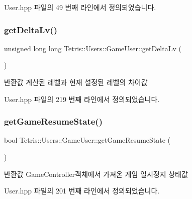 User.\+hpp 파일의 49 번째 라인에서 정의되었습니다.

\mbox{\label{class_tetris_1_1_users_1_1_game_user_a1a55323cff69015417ad4d214b985724}} 
\subsubsection{\texorpdfstring{get\+Delta\+Lv()}{getDeltaLv()}}
{\footnotesize\ttfamily unsigned long long Tetris\+::\+Users\+::\+Game\+User\+::get\+Delta\+Lv (\begin{DoxyParamCaption}{ }\end{DoxyParamCaption})\hspace{0.3cm}{\ttfamily [inline]}}

\begin{DoxyReturn}{반환값}
계산된 레벨과 현재 설정된 레벨의 차이값 
\end{DoxyReturn}


User.\+hpp 파일의 219 번째 라인에서 정의되었습니다.

\mbox{\label{class_tetris_1_1_users_1_1_game_user_a12cc139cfa5d31708d0e53b07e110ab3}} 
\subsubsection{\texorpdfstring{get\+Game\+Resume\+State()}{getGameResumeState()}}
{\footnotesize\ttfamily bool Tetris\+::\+Users\+::\+Game\+User\+::get\+Game\+Resume\+State (\begin{DoxyParamCaption}{ }\end{DoxyParamCaption})\hspace{0.3cm}{\ttfamily [inline]}}

\begin{DoxyReturn}{반환값}
Game\+Controller객체에서 가져온 게임 일시정지 상태값 
\end{DoxyReturn}


User.\+hpp 파일의 201 번째 라인에서 정의되었습니다.

